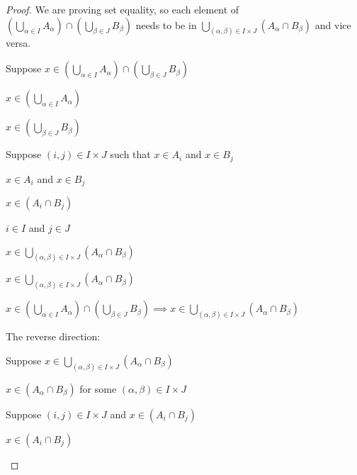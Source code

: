 \documentclass[../../main.tex]{subfiles}
\begin{document}
\begin{proof}
    We are proving set equality, so each element of $(\bigcup_{\alpha \in I} A_{\alpha}) \cap (\bigcup_{\beta \in J} B_{\beta})$ needs to be in $\bigcup_{(\alpha, \beta) \in I \times J} (A_{\alpha} \cap B_{\beta})$ and vice versa.
    \begin{linebyline}
        \item Suppose $x \in (\bigcup_{\alpha \in I} A_{\alpha}) \cap (\bigcup_{\beta \in J} B_{\beta})$
        \begin{linebyline}
            \item $x \in (\bigcup_{\alpha \in I} A_{\alpha})$
            \item $x \in (\bigcup_{\beta \in J} B_{\beta})$
            \item Suppose $(i,j) \in I \times J$ such that $x \in A_i$ and $x \in B_j$
            \begin{linebyline}
                \item $x \in A_i$ and $x \in B_j$
                \item $x \in (A_i \cap B_j)$
                \item $i \in I$ and $j \in J$
                \item $x \in \bigcup_{(\alpha, \beta) \in I \times J} (A_{\alpha} \cap B_{\beta})$
            \end{linebyline}
            \item $x \in \bigcup_{(\alpha, \beta) \in I \times J} (A_{\alpha} \cap B_{\beta})$ 
        \end{linebyline}
        \item $x \in (\bigcup_{\alpha \in I} A_{\alpha}) \cap (\bigcup_{\beta \in J} B_{\beta}) \implies x \in \bigcup_{(\alpha, \beta) \in I \times J} (A_{\alpha} \cap B_{\beta})$
    \end{linebyline}
    The reverse direction:
    \begin{linebyline}[resume]
        \item Suppose $x \in \bigcup_{(\alpha, \beta) \in I \times J} (A_{\alpha} \cap B_{\beta})$
        \begin{linebyline}
            \item $x \in (A_{\alpha} \cap B_{\beta})$ for some $(\alpha, \beta) \in I \times J$ 
            \item Suppose $(i, j) \in I \times J$ and $x \in (A_{i} \cap B_{j})$
            \begin{linebyline}
                \item $x \in (A_{i} \cap B_{j})$

\end{linebyline}
\end{linebyline}
\end{linebyline}
\end{proof}
\end{document}
